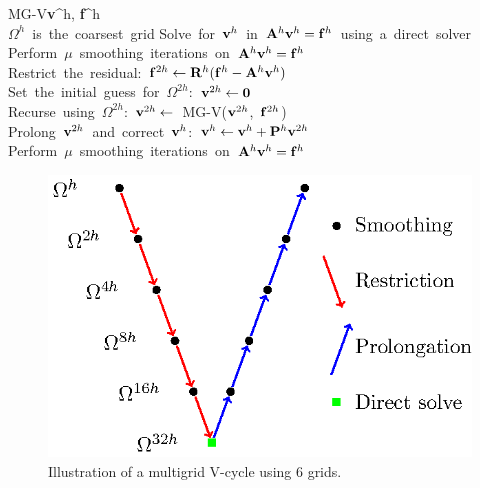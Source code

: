 \documentclass[11pt]{iopart}
\begin{document}
\begin{center}
\begin{pseudocode}[doublebox]{MG-V}{{\bf v}^h, {\bf f}^h}
\label{alg:vcycle}
\\
\IF \mbox{$\Omega^h$ is the coarsest grid}
\THEN \mbox{Solve for ${\bf v}^h$ in ${\bf A}^h {\bf v}^h = {\bf f}^h$ using a direct solver}
\ELSE 
\BEGIN
\mbox{Perform $\mu$ smoothing iterations on ${\bf A}^h {\bf v}^h = {\bf f}^h$} \\
\mbox{Restrict the residual: ${\bf f}^{2h} \leftarrow {\bf R}^h({\bf f}^h - {\bf A}^h {\bf v}^h)$}\\
\mbox{Set the initial guess for $\Omega^{2h}$: ${\bf v}^{2h} \leftarrow {\bf 0}$} \\
\mbox{Recurse using $\Omega^{2h}$: ${\bf v}^{2h} \leftarrow$ MG-V(${\bf v}^{2h}$, ${\bf f}^{2h}$)} \\
\mbox{Prolong ${\bf v}^{2h}$ and correct ${\bf v}^h$: ${\bf v}^h \leftarrow {\bf v}^h + {\bf P}^h {\bf v}^{2h}$}\\
\mbox{Perform $\mu$ smoothing iterations on ${\bf A}^h {\bf v}^h = {\bf f}^h$}
\END \\
\end{pseudocode}
\end{center}

\begin{figure}
\begin{center}
\includegraphics[scale=1.0]{vcycle.eps}
\caption{\label{fig:vcycle} Illustration of a multigrid V-cycle using 6 grids.}
\end{center}
\end{figure}
\end{document}

